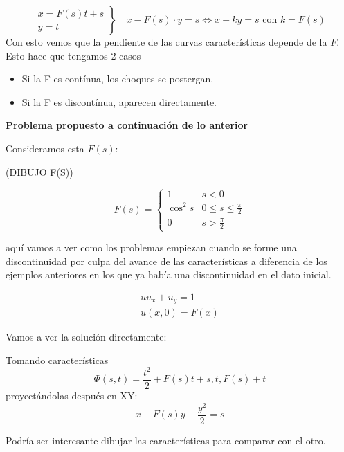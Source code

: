 \begin{example}{1}
		\[
		\left.
\begin{array}{r}
x = F(s)t + s \\
y = t
\end{array}
\right\} \quad x - F(s)\cdot y = s \iff x - ky = s \text{ con } k = F(s)
		\]
		Con esto vemos que la pendiente de las curvas características depende de la $F$. Esto hace que tengamos 2 casos
		\begin{itemize}
			\item Si la F es contínua, los choques se postergan.
			\item Si la F es discontínua, aparecen directamente.
		\end{itemize}


	\end{example}

	\textbf{Problema propuesto a continuación de lo anterior}

	Consideramos esta $F(s)$:

	(DIBUJO F(S))

	\[
	F(s) =
	\begin{cases}
	1 & s < 0 \\
	\cos^2 s & 0 \leq s \leq \frac{\pi}{2} \\
	0 & s > \frac{\pi}{2}
	\end{cases}
	\]

	aquí vamos a ver como los problemas empiezan cuando se forme una discontinuidad por culpa del avance de las características a diferencia de los ejemplos anteriores en los que ya había una discontinuidad en el dato inicial.

	\begin{example}{2}

		\[
		\begin{array}{l}
			u u_x + u_y = 1 \\
			u(x,0) = F(x)
		\end{array}
		\]

		Vamos a ver la solución directamente:

		Tomando características \[ \Phi(s,t) = \frac{t^2}{2} + F(s) t + s, t, F(s) + t \] proyectándolas después en XY: \[ x - F(s)y - \frac{y^2}{2} = s \]

		Podría ser interesante dibujar las características para comparar con el otro.

	\end{example}

